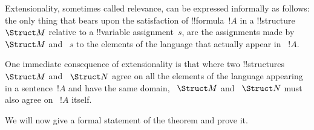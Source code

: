 \documentclass[../../include/open-logic-section]{subfiles}
\begin{document}


\begin{explain}
Extensionality, sometimes called relevance, can be expressed informally as follows: the only thing that bears upon the satisfaction of !!{formula}~$!A$ in a !!{structure}~$\Struct M$ relative to a !!{variable} assignment~$s$, are the assignments made by ~$\Struct M$ and ~$s$ to the elements of the language that actually appear in ~$!A$.

One immediate consequence of extensionality is that where two !!{structures}~$\Struct M$ and ~$\Struct N$ agree on all the elements of the language appearing in a sentence~$!A$ and have the same domain, ~$\Struct M$ and ~$\Struct N$ must also agree on ~$!A$ itself.

We will now give a formal statement of the theorem and prove it.
\end{explain}
\end{document}
